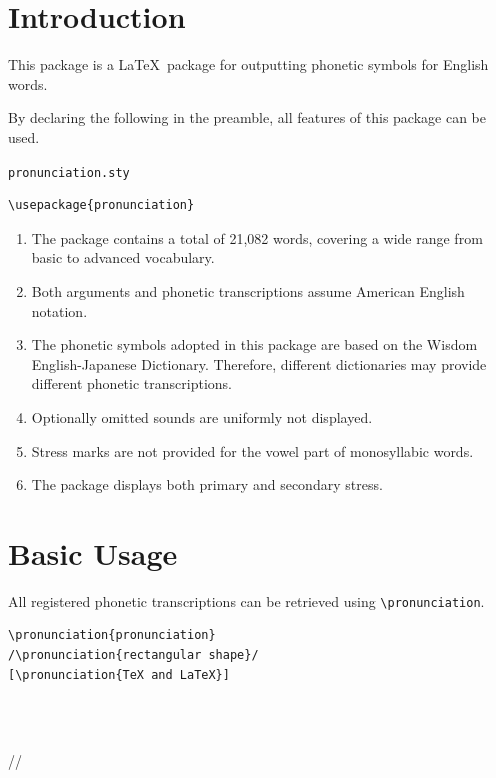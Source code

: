 \documentclass[b5j,10pt]{tetsujsarticle}%
\title{\pl{pronunciation.sty (Ver1.0.2)}}%
\author{\pl{Hugh}}%
\makeatletter
\newenvironment{Definition}[1]%
  {%
    \VerbatimEnvironment\noindent%
    \begin{minipage}{.48\linewidth}%
      \begin{itembox}[c]{\gt{\texttt{#1}}}%
  }%
  {%
      \end{itembox}%
    \end{minipage}%
  }%
\newenvironment{Result}%
  {%
    \ \,\raisebox{-.2zw}{\白右矢印}\,\,%
      \begin{minipage}{.48\linewidth}%
        \begin{colorshadebox}[@lavender]%
  }%
  {%
        \end{colorshadebox}%
      \end{minipage}\br{.7}%
  }%
\makeatother
\begin{document}
%

\maketitle%

\section{Introduction}

This package is a \LaTeX\ package for outputting phonetic symbols for English words.

By declaring the following in the preamble, all features of this package can be used.

\begin{itembox}[c]{\texttt{pronunciation.sty}}
\begin{verbatim}
\usepackage{pronunciation}
\end{verbatim}
\end{itembox}

\notebox%
  {%
    \begin{enumerate}[・]
      \item The package contains a total of 21,082 words, covering a wide range from basic to advanced vocabulary.
      \item Both arguments and phonetic transcriptions assume American English notation.
      \item The phonetic symbols adopted in this package are based on the Wisdom English-Japanese Dictionary. Therefore, different dictionaries may provide different phonetic transcriptions.
      \item Optionally omitted sounds are uniformly not displayed.
      \item Stress marks are not provided for the vowel part of monosyllabic words.
      \item The package displays both primary and secondary stress.
    \end{enumerate}
  }

\section{Basic Usage}

All registered phonetic transcriptions can be retrieved using \verb|\pronunciation|.

\begin{Definition}{\texttt{\textbackslash pronunciation}}
\begin{verbatim}
\pronunciation{pronunciation}
/\pronunciation{rectangular shape}/
[\pronunciation{TeX and LaTeX}]
\end{verbatim}
\end{Definition}\begin{Result}
\\
//\par%
[\pronunciation{TeX and LaTeX}]
\end{Result}
\end{document}

